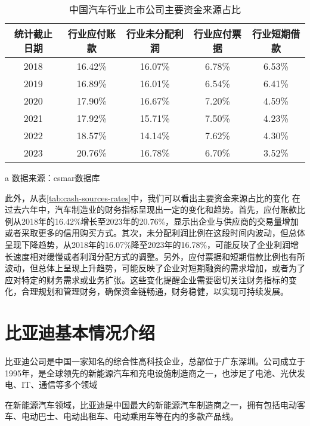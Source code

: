 \begin{table}
  \centering
  \begin{threeparttable}[c]
    \caption{中国汽车行业上市公司主要资金来源占比}
    \label{tab:cash-sources-rates}
    \begin{tabular}{ccccc}
      \toprule
         统计截止日期 & 行业应付账款 & 行业未分配利润 & 行业应付票据 & 行业短期借款 \\ 
      \midrule
        2018 & 16.42\% & 16.07\% & 6.78\% & 6.53\% \\ 
        2019 & 16.89\% & 16.01\% & 6.54\% & 6.41\% \\ 
        2020 & 17.90\% & 16.67\% & 7.20\% & 4.59\% \\
        2021 & 17.92\% & 15.71\% & 7.50\% & 4.23\% \\ 
        2022 & 18.57\% & 14.14\% & 7.62\% & 4.30\% \\ 
        2023 & 20.76\% & 16.78\% & 6.70\% & 3.52\% \\ 
      \bottomrule
    \end{tabular}
    \begin{tablenotes}
      \item [a] 数据来源：csmar数据库
    \end{tablenotes}
  \end{threeparttable}
\end{table}
此外，从表\eqref{tab:cash-sources-rates}中，我们可以看出主要资金来源占比的变化 在过去六年中，汽车制造业的财务指标呈现出一定的变化和趋势。首先，应付账款比例从2018年的16.42\%增长至2023年的20.76\%，显示出企业与供应商的交易量增加或者采取更多的信用购买方式。其次，未分配利润比例在这段时间内波动，但总体呈现下降趋势，从2018年的16.07\%降至2023年的16.78\%，可能反映了企业利润增长速度相对缓慢或者利润分配方式的调整。另外，应付票据和短期借款比例也有所波动，但总体上呈现上升趋势，可能反映了企业对短期融资的需求增加，或者为了应对特定的财务需求或业务扩张。这些变化提醒企业需要密切关注财务指标的变化，合理规划和管理财务，确保资金链畅通，财务稳健，以实现可持续发展。
\section{比亚迪基本情况介绍}
比亚迪公司是中国一家知名的综合性高科技企业，总部位于广东深圳。公司成立于1995年，是全球领先的新能源汽车和充电设施制造商之一，也涉足了电池、光伏发电、IT、通信等多个领域

在新能源汽车领域，比亚迪是中国最大的新能源汽车制造商之一，拥有包括电动客车、电动巴士、电动出租车、电动乘用车等在内的多款产品线。

